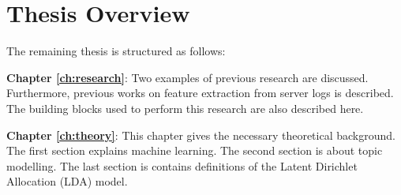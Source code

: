 \begin{comment}

How do we define similair messages?

Can we cluster these error messages to find patterns?

Wat ik zou verwachten in je scriptie zijn de volgende topics
•	Wat is het probleem (de probleemstelling)?
•	Welke mogelijkheden zijn er om dit probleem op te lossen?
•	Welke methode heb je gekozen, en vooral uitleggen waarom deze methode volgens jou de beste is?
•	Hoe heb je vastgesteld dat de gekozen oplossing de beste is?
•	Wat is de uitkomst?
•	Wat zijn de voor en nadelen van het gekozen model, wat zijn de beperkingen, wat is de optimale modelering en waarom?
Zijn deze onderwerpen voldoende afgedicht in onderstaande structuur?

Ik ben veel meer geïnteresseerd in de onderbouwing:
•	Wat is de (onze) probleem omschrijving
Finding structures in syslogs to cluster undiscovered syslogs with errors
•	Waarom kies je LDA om dit probleem te lijf te gaan
o	Pro’s / con’s
o	Alternatieven
•	Hoe moet LDA gebruikt worden
o	Welke specifieke tuning heb je gebruikt
o	Hoe beinvloed de aanpassingen van parameters de uitkomst


\textbf{Can we make a reliable model for error detection in system logs?}

 \end{comment}
 
\section{Thesis Overview} \label{introduction:thesisoverview}
The remaining thesis is structured as follows:

\setlength{\parindent}{3ex} \textbf{Chapter \ref{ch:research}}: Two examples of previous research are discussed. Furthermore, previous works on feature extraction from server logs is described. The building blocks used to perform this research are also described here.


\textbf{Chapter \ref{ch:theory}}: This chapter gives the necessary theoretical background. The first section explains machine learning. The second section is about topic modelling. The last section is contains definitions of the Latent Dirichlet Allocation (LDA) model. 


\begin{comment}
natural language processing, feature extraction, types of system logs, the application of machine learning, general machine learning knowledge 
\end{comment}

